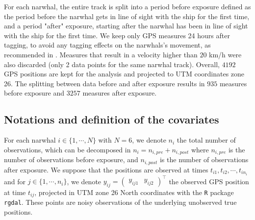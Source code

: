 \documentclass[11pt]{article}
\newcommand {\1}{\mathbb{1}}
\theoremstyle{definition}
\theoremstyle{remark}
\theoremstyle{remark}
\begin{document}
For each narwhal, the entire track is split into a period before exposure defined as the period before the narwhal gets in line of sight with the ship for the first time, and a period "after" exposure, starting after the narwhal has been in line of sight with the ship for the first time. We keep only GPS measures 24 
hours after tagging, to avoid any tagging effects on the narwhals's movement, as recommended in \cite{heide-jorgensen_behavioral_2021}.
Measures that result in a velocity higher than $20$ km/h were also discarded (only 2 data points for the same narwhal track).
Overall, $4192$ GPS positions are kept for the analysis and projected to UTM coordinates zone 26. The splitting between data before and after exposure results in $935$ measures before exposure and $3257$ measures after exposure.

\subsection{Notations and definition of the covariates}
\label{subsection: covariates}

For each narwhal $i \in \{1,\cdots,N\}$ with $N=6$, we denote $n_i$ the total number of observations, which can be decomposed in $n_i=n_{i,pre}+n_{i,post}$ where $n_{i,pre}$ is the number of observations before exposure, and $n_{i,post}$ is the number of observations after exposure. We suppose that the positions are observed at times $t_{i1}, t_{i2}, \cdots,t_{in_i}$ and  for $j \in \{1,\cdots,n_i\}$, we denote $y_{ij}=\begin{pmatrix} y_{ij1} & y_{ij2} \end{pmatrix}^\top$ the observed GPS position at time $t_{ij}$, projected in UTM zone 26 North coordinates with the \texttt{R} package \texttt{rgdal}. These points are noisy observations of the underlying unobserved true positions.\\
\end{document}
